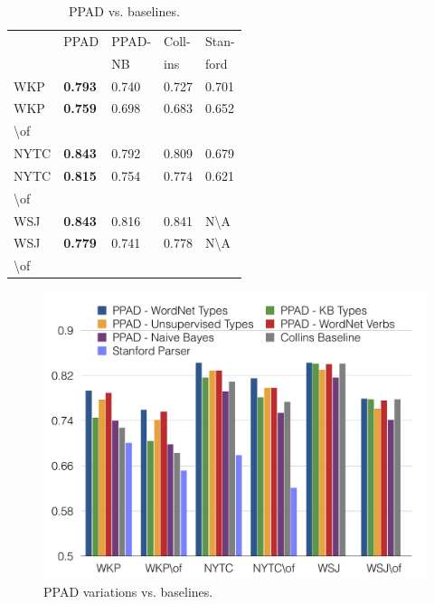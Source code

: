 \begin{table}[t]
\centering
\begin{tabular}{|l|l|l|l|l|}
\hline
& PPAD& PPAD- &Coll-& Stan-\\
& & NB &ins& ford\\
\hline
WKP &  \bf{0.793} &	0.740&	0.727&	0.701\\
\hline
WKP  & \bf{0.759} &	0.698&	0.683&	0.652 \\
\textbackslash of  & & & & \\
\hline
NYTC & \bf{0.843}	& 0.792	&0.809	&0.679\\
\hline
NYTC& \bf{0.815}	& 0.754&	0.774&	0.621\\
\textbackslash of  & & & & \\
\hline
WSJ & \bf{0.843}&	0.816&	0.841& N\textbackslash A \\
\hline
WSJ & \bf{0.779}	& 0.741&	0.778&N\textbackslash A  \\
\textbackslash of  & & & & \\
\hline
\end{tabular}
 \caption{PPAD  vs. baselines.}
   \label{fig:resultmain}
\end{table}
    

\begin{figure}[t]
%
\centering
%
\includegraphics[width=1\columnwidth] {mainresults-2.pdf}
%
\vspace*{-1cm}
\caption{PPAD variations vs. baselines.}
%
\label{fig:resultmain2}
%
\end{figure}
    
   
    
